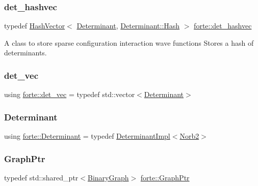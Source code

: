\subsubsection{\texorpdfstring{det\+\_\+hashvec}{det\_hashvec}}
{\footnotesize\ttfamily typedef \mbox{\hyperlink{class_hash_vector}{Hash\+Vector}}$<$ \mbox{\hyperlink{namespaceforte_a2076c63fd7b8732004d9e1442ce527c1}{Determinant}}, \mbox{\hyperlink{structforte_1_1_bit_array_1_1_hash}{Determinant\+::\+Hash}} $>$ \mbox{\hyperlink{namespaceforte_aee00ff2f656f0aa613d3f9f1ba01cad5}{forte\+::det\+\_\+hashvec}}}



A class to store sparse configuration interaction wave functions Stores a hash of determinants. 

\mbox{\label{namespaceforte_a2957b68e47fded14fd14ef47796ed751}} 
\subsubsection{\texorpdfstring{det\+\_\+vec}{det\_vec}}
{\footnotesize\ttfamily using \mbox{\hyperlink{namespaceforte_a2957b68e47fded14fd14ef47796ed751}{forte\+::det\+\_\+vec}} = typedef std\+::vector$<$\mbox{\hyperlink{namespaceforte_a2076c63fd7b8732004d9e1442ce527c1}{Determinant}}$>$}

\mbox{\label{namespaceforte_a2076c63fd7b8732004d9e1442ce527c1}} 
\subsubsection{\texorpdfstring{Determinant}{Determinant}}
{\footnotesize\ttfamily using \mbox{\hyperlink{namespaceforte_a2076c63fd7b8732004d9e1442ce527c1}{forte\+::\+Determinant}} = typedef \mbox{\hyperlink{classforte_1_1_determinant_impl}{Determinant\+Impl}}$<$\mbox{\hyperlink{namespaceforte_adf4c83dd9e12e4643afac07f1a89e7bb}{Norb2}}$>$}

\mbox{\label{namespaceforte_a4669cbddcd761bcaee151bc7cff6c444}} 
\subsubsection{\texorpdfstring{Graph\+Ptr}{GraphPtr}}
{\footnotesize\ttfamily typedef std\+::shared\+\_\+ptr$<$\mbox{\hyperlink{classforte_1_1_binary_graph}{Binary\+Graph}}$>$ \mbox{\hyperlink{namespaceforte_a4669cbddcd761bcaee151bc7cff6c444}{forte\+::\+Graph\+Ptr}}}

